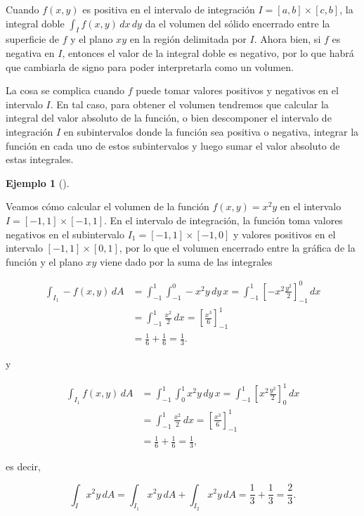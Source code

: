 \documentclass[
  a4paper,
]{scrreport}
\theoremstyle{definition}
\theoremstyle{definition}
\newtheorem{example}{Ejemplo}[chapter]
\theoremstyle{definition}
\theoremstyle{plain}
\theoremstyle{plain}
\theoremstyle{plain}
\theoremstyle{remark}
\begin{document}
Cuando \(f(x,y)\) es positiva en el intervalo de integración
\(I=[a,b]\times[c,b]\), la integral doble \(\int_I f(x,y)\,dx\,dy\) da
el volumen del sólido encerrado entre la superficie de \(f\) y el plano
\(xy\) en la región delimitada por \(I\). Ahora bien, si \(f\) es
negativa en \(I\), entonces el valor de la integral doble es negativo,
por lo que habrá que cambiarla de signo para poder interpretarla como un
volumen.

La cosa se complica cuando \(f\) puede tomar valores positivos y
negativos en el intervalo \(I\). En tal caso, para obtener el volumen
tendremos que calcular la integral del valor absoluto de la función, o
bien descomponer el intervalo de integración \(I\) en subintervalos
donde la función sea positiva o negativa, integrar la función en cada
uno de estos subintervalos y luego sumar el valor absoluto de estas
integrales.

\begin{example}[]\protect\hypertarget{exm-volumen-integral-doble}{}\label{exm-volumen-integral-doble}

Veamos cómo calcular el volumen de la función \(f(x,y)=x^2y\) en el
intervalo \(I=[-1,1]\times[-1,1]\). En el intervalo de integración, la
función toma valores negativos en el subintervalo
\(I_1=[-1,1]\times[-1,0]\) y valores positivos en el intervalo
\([-1,1]\times[0,1]\), por lo que el volumen encerrado entre la gráfica
de la función y el plano \(xy\) viene dado por la suma de las integrales

\begin{align*}
\int_{I_1} -f(x,y)\,dA 
&= \int_{-1}^1\int_{-1}^0 -x^2y\,dy\,x
= \int_{-1}^1 \left[-x^2\frac{y^2}{2}\right]_{-1}^0\,dx \\
&= \int_{-1}^1 \frac{x^2}{2}\,dx
= \left[\frac{x^3}{6}\right]_{-1}^1 \\
&= \frac{1}{6}+\frac{1}{6} 
= \frac{1}{3}.
\end{align*}

y

\begin{align*}
\int_{I_1} f(x,y)\,dA 
&= \int_{-1}^1\int_0^1 x^2y\,dy\,x
= \int_{-1}^1 \left[x^2\frac{y^2}{2}\right]_0^1\,dx \\
&= \int_{-1}^1 \frac{x^2}{2}\,dx
= \left[\frac{x^3}{6}\right]_{-1}^1 \\
&= \frac{1}{6}+\frac{1}{6} 
= \frac{1}{3},
\end{align*}

es decir,

\[
\int_I x^2y\,dA 
= \int_{I_1} x^2y\,dA + \int_{I_2} x^2y\,dA
= \frac{1}{3} + \frac{1}{3}
= \frac{2}{3}.
\]

\end{example}
\end{document}

